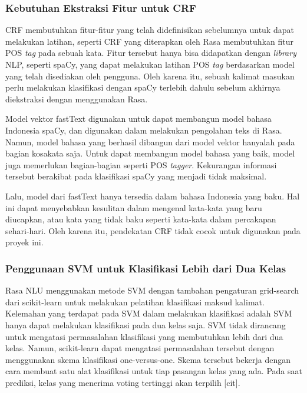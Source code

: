 \subsubsection{Kebutuhan Ekstraksi Fitur untuk CRF}

CRF membutuhkan fitur-fitur yang telah didefinisikan sebelumnya untuk dapat melakukan latihan, seperti CRF yang diterapkan oleh Rasa membutuhkan fitur POS \textit{tag} pada sebuah kata. Fitur tersebut hanya bisa didapatkan dengan \textit{library} NLP, seperti spaCy, yang dapat melakukan latihan POS \textit{tag} berdasarkan model yang telah disediakan oleh pengguna. Oleh karena itu, sebuah kalimat masukan perlu melakukan klasifikasi dengan spaCy terlebih dahulu sebelum akhirnya diekstraksi dengan menggunakan Rasa.

Model vektor fastText digunakan untuk dapat membangun model bahasa Indonesia spaCy, dan digunakan dalam melakukan pengolahan teks di Rasa. Namun, model bahasa yang berhasil dibangun dari model vektor hanyalah pada bagian kosakata saja. Untuk dapat membangun model bahasa yang baik, model juga memerlukan bagian-bagian seperti POS \textit{tagger}. Kekurangan informasi tersebut berakibat pada klasifikasi spaCy yang menjadi tidak maksimal.

Lalu, model dari fastText hanya tersedia dalam bahasa Indonesia yang baku. Hal ini dapat menyebabkan kesulitan dalam mengenal kata-kata yang baru diucapkan, atau kata yang tidak baku seperti kata-kata dalam percakapan sehari-hari. Oleh karena itu, pendekatan CRF tidak cocok untuk digunakan pada proyek ini.

\subsubsection{Penggunaan SVM untuk Klasifikasi Lebih dari Dua Kelas}

Rasa NLU menggunakan metode SVM dengan tambahan pengaturan grid-search dari scikit-learn untuk melakukan pelatihan klasifikasi maksud kalimat. Kelemahan yang terdapat pada SVM dalam melakukan klasifikasi adalah SVM hanya dapat melakukan klasifikasi pada dua kelas saja. SVM tidak dirancang untuk mengatasi permasalahan klasifikasi yang membutuhkan lebih dari dua kelas. Namun, scikit-learn dapat mengatasi permasalahan tersebut dengan menggunakan skema klasifikasi one-versus-one. Skema tersebut bekerja dengan cara membuat satu alat klasifikasi untuk tiap pasangan kelas yang ada. Pada saat prediksi, kelas yang menerima voting tertinggi akan terpilih [cit].

